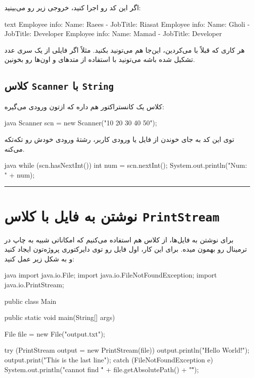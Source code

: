 اگر این کد رو اجرا کنید، خروجی زیر رو می‌بینید:

\begin{codebox}{text}
Employee info:   
    Name: Raees - JobTitle: Riasat  
Employee info:   
    Name: Gholi - JobTitle: Developer  
Employee info:   
    Name: Mamad - JobTitle: Developer
\end{codebox}

هر کاری که قبلاً با  می‌کردین، این‌جا هم می‌تونید
بکنید. مثلاً اگر فایلی از یک سری عدد تشکیل شده باشه می‌تونید با استفاده از
متدهای  و  اون‌ها رو
بخونین.

\subsection{کلاس \texttt{Scanner} با \texttt{String}}

کلاس  یک کانستراکتور هم داره که ازتون
 ورودی می‌گیره:

\begin{codebox}{java}
Scanner scn = new Scanner("10 20 30 40 50");
\end{codebox}

توی این کد  به جای خوندن از فایل یا ورودی کاربر،
رشتهٔ ورودی خودش رو تکه‌تکه  می‌کنه.

\begin{codebox}{java}
while (scn.hasNextInt()) {
    int num = scn.nextInt();  
    System.out.println("Num: " + num);  
}
\end{codebox}

\begin{center}\rule{0.5\linewidth}{0.5pt}\end{center}

\section{نوشتن به فایل با کلاس \texttt{PrintStream}}

برای نوشتن به فایل‌ها، از کلاس  هم استفاده
می‌کنیم که امکاناتی شبیه به چاپ در ترمینال رو بهمون میده. برای این کار،
اول فایل  رو توی دایرکتوری پروژه‌تون ایجاد کنید و
به شکل زیر عمل کنید:

\begin{codebox}{java}
import java.io.File;
import java.io.FileNotFoundException;
import java.io.PrintStream;

public class Main {
    public static void main(String[] args)  {
        File file = new File("output.txt");  

        try (PrintStream output = new PrintStream(file)) {
            output.println("Hello World!");  
            output.print("This is the last line");
        } catch (FileNotFoundException e) {  
            System.out.println("cannot find \"" + file.getAbsolutePath() + "\"");
        }
    }
}
\end{codebox}


